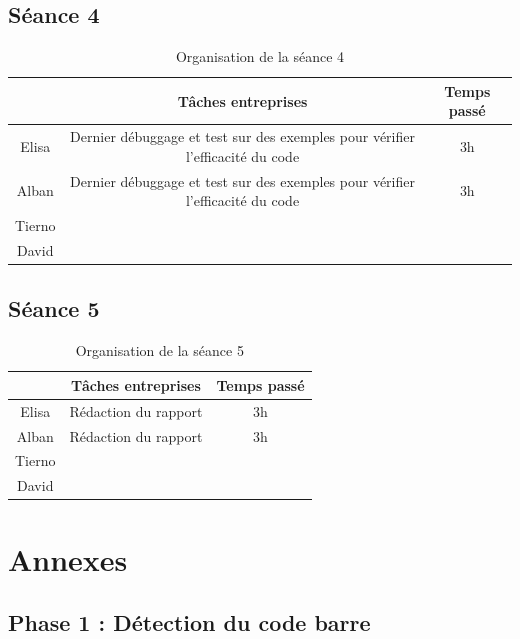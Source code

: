 \documentclass{rapport}
\begin{document}
\subsection{Séance 4}

\begin{table}[H]
	\centering 
	\begin{tabular}{c|c|c}
		& Tâches entreprises& Temps passé\\ \hline
		Elisa& Dernier débuggage et test sur des exemples pour vérifier l'efficacité du code& 3h\\ \hline
		Alban& Dernier débuggage et test sur des exemples pour vérifier l'efficacité du code& 3h\\ \hline
		Tierno& & \\ \hline
		David& & 
	\end{tabular}
	\caption{Organisation de la séance 4}
\end{table}

\subsection{Séance 5} %

\begin{table}[H]
	\centering 
	\begin{tabular}{c|c|c}
		& Tâches entreprises& Temps passé\\ \hline
		Elisa& Rédaction du rapport & 3h\\ \hline
		Alban& Rédaction du rapport & 3h\\ \hline
		Tierno& & \\ \hline
		David& & 
	\end{tabular}
	\caption{Organisation de la séance 5}
\end{table}

\newpage

\section{Annexes}

\lstset{style=mystyle}

\subsection{Phase 1 : Détection du code barre}
\end{document}
